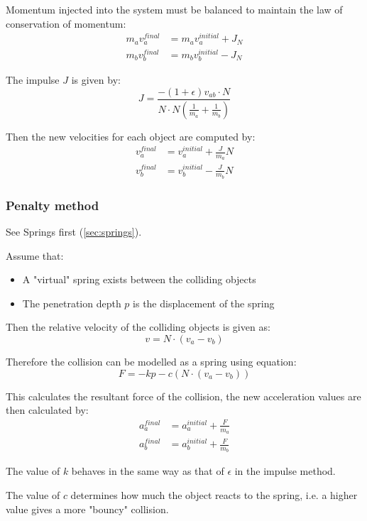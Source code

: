 \documentclass[a4paper]{article}
\begin{document}
Momentum injected into the system must be balanced to maintain the law of
conservation of momentum:
\begin{align*}
  m_{a} v_{a}^{final} &= m_{a} v_{a}^{initial} + J_{N} \\
  m_{b} v_{b}^{final} &= m_{b} v_{b}^{initial} - J_{N}
\end{align*}

The impulse $J$ is given by:
\[
  J = \frac{-\left(1 + \epsilon \right) v_{ab} \cdot N}
           {N \cdot N \left(\frac{1}{m_{a}} + \frac{1}{m_{b}}\right)}
\]

Then the new velocities for each object are computed by:
\begin{align*}
  v_{a}^{final} &= v_{a}^{initial} + \frac{J}{m_{a}} N \\
  v_{b}^{final} &= v_{b}^{initial} - \frac{J}{m_{b}} N
\end{align*}

\subsubsection{Penalty method}

See Springs first (\ref{sec:springs}).

Assume that:
\begin{itemize}
  \item A "virtual" spring exists between the colliding objects
  \item The penetration depth $p$ is the displacement of the spring
\end{itemize}

Then the relative velocity of the colliding objects is given as:
\[
  v = N \cdot (v_{a} - v_{b})
\]

Therefore the collision can be modelled as a spring using equation:
\[
  F = -kp - c \left(N \cdot (v_{a} - v_{b})\right)
\]

This calculates the resultant force of the collision, the new acceleration
values are then calculated by:
\begin{align*}
  a_{a}^{final} &= a_{a}^{initial} + \frac{F}{m_{a}} \\
  a_{b}^{final} &= a_{b}^{initial} + \frac{F}{m_{b}}
\end{align*}

The value of $k$ behaves in the same way as that of $\epsilon$ in the impulse
method.

The value of $c$ determines how much the object reacts to the spring, i.e. a
higher value gives a more "bouncy" collision.
\end{document}
